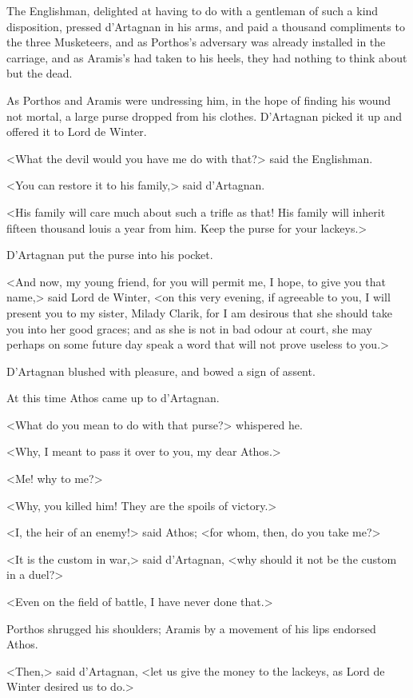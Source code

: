 The Englishman, delighted at having to do with a gentleman of such a kind disposition, pressed d'Artagnan in his arms, and paid a thousand compliments to the three Musketeers, and as Porthos's adversary was already installed in the carriage, and as Aramis's had taken to his heels, they had nothing to think about but the dead. 

As Porthos and Aramis were undressing him, in the hope of finding his wound not mortal, a large purse dropped from his clothes. D'Artagnan picked it up and offered it to Lord de Winter. 

<What the devil would you have me do with that?> said the Englishman. 

<You can restore it to his family,> said d'Artagnan. 

<His family will care much about such a trifle as that! His family will inherit fifteen thousand louis a year from him. Keep the purse for your lackeys.> 

D'Artagnan put the purse into his pocket. 

<And now, my young friend, for you will permit me, I hope, to give you that name,> said Lord de Winter, <on this very evening, if agreeable to you, I will present you to my sister, Milady Clarik, for I am desirous that she should take you into her good graces; and as she is not in bad odour at court, she may perhaps on some future day speak a word that will not prove useless to you.> 

D'Artagnan blushed with pleasure, and bowed a sign of assent. 

At this time Athos came up to d'Artagnan. 

<What do you mean to do with that purse?> whispered he. 

<Why, I meant to pass it over to you, my dear Athos.> 

<Me! why to me?> 

<Why, you killed him! They are the spoils of victory.> 

<I, the heir of an enemy!> said Athos; <for whom, then, do you take me?> 

<It is the custom in war,> said d'Artagnan, <why should it not be the custom in a duel?> 

<Even on the field of battle, I have never done that.> 

Porthos shrugged his shoulders; Aramis by a movement of his lips endorsed Athos. 

<Then,> said d'Artagnan, <let us give the money to the lackeys, as Lord de Winter desired us to do.> 


